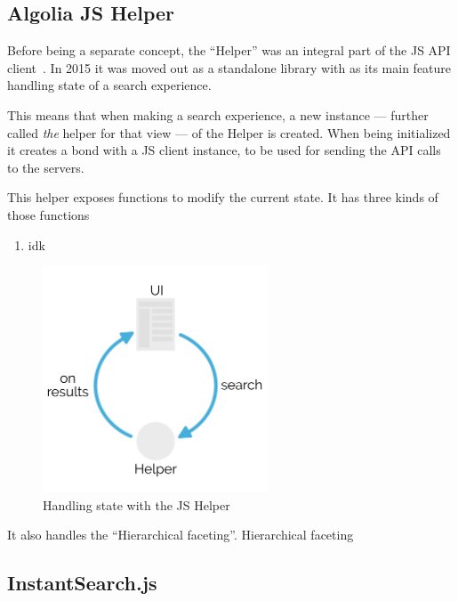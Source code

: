 
\subsection{Algolia JS Helper} %
\label{sub:algolia_js_helper}

Before being a separate concept, the ``Helper'' was an integral part of the JS API client~\cite{algolia-blog-js-client}. In 2015 it was moved out as a standalone library with as its main feature handling state of a search experience.

This means that when making a search experience, a new instance --- further called \emph{the} helper for that view --- of the Helper is created. When being initialized it creates a bond with a JS client instance, to be used for sending the API calls to the servers.

This helper exposes functions to modify the current state. It has three kinds of those functions

\begin{enumerate}
  \item idk %
\end{enumerate}

\begin{figure}[H]
\label{figure:js-helper-state}
  \centering
  \includegraphics[width=0.6\textwidth]{../assets/helper-cycle.pdf}
  \caption{Handling state with the JS Helper\cite{js-helper-concepts}}
\end{figure}

It also handles the ``Hierarchical faceting''\cite{hierarchical-faceting}. Hierarchical faceting %


\subsection{InstantSearch.js} %
\label{sub:instantsearch_js}

